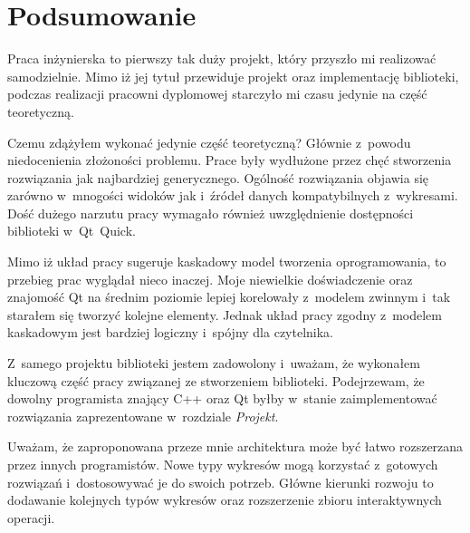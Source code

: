 \chapter{Podsumowanie}
Praca inżynierska to pierwszy tak duży projekt, który przyszło mi realizować samodzielnie. Mimo iż jej tytuł przewiduje projekt oraz implementację biblioteki, podczas realizacji pracowni dyplomowej starczyło mi czasu jedynie na część teoretyczną.

Czemu zdążyłem wykonać jedynie część teoretyczną? Głównie z~powodu niedocenienia złożoności problemu. Prace były wydłużone przez chęć stworzenia rozwiązania jak najbardziej generycznego. Ogólność rozwiązania objawia się zarówno w~mnogości widoków jak i~źródeł danych kompatybilnych z~wykresami. Dość dużego narzutu pracy wymagało również uwzględnienie dostępności biblioteki w~Qt~Quick.

Mimo iż układ pracy sugeruje kaskadowy model tworzenia oprogramowania, to przebieg prac wyglądał nieco inaczej. Moje niewielkie doświadczenie oraz znajomość Qt na średnim poziomie lepiej korelowały z~modelem zwinnym i~tak starałem się tworzyć kolejne elementy. Jednak układ pracy zgodny z~modelem kaskadowym jest bardziej logiczny i~spójny dla czytelnika.

Z~samego projektu biblioteki jestem zadowolony i~uważam, że wykonałem kluczową część pracy związanej ze stworzeniem biblioteki. Podejrzewam, że dowolny programista znający C++ oraz Qt byłby w~stanie zaimplementować rozwiązania zaprezentowane w~rozdziale \textit{Projekt}.

Uważam, że zaproponowana przeze mnie architektura może być łatwo rozszerzana przez innych programistów. Nowe typy wykresów mogą korzystać z~gotowych rozwiązań i~dostosowywać je do swoich potrzeb. Główne kierunki rozwoju to dodawanie kolejnych typów wykresów oraz rozszerzenie zbioru interaktywnych operacji.

